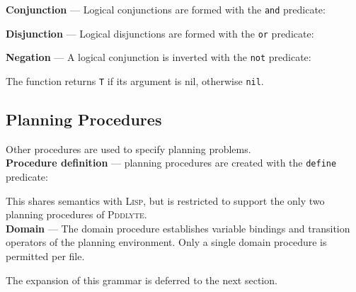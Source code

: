 \documentclass[
a4paper, %
11pt, %
onecolumn, %
openany, %
]{memoir}
\begin{document}
{\textbf{\small Conjunction} --- Logical conjunctions are formed with the \texttt{and} predicate: 
\begin{bnf*}
\end{bnf*}


\textbf{\small Disjunction} --- Logical disjunctions are formed with the \texttt{or} predicate:

\begin{bnf*}
\end{bnf*}

\textbf{\small Negation} --- A logical conjunction is inverted with the \texttt{not} predicate:
\begin{bnf*}
\end{bnf*}
The function returns \texttt{T} if its argument is nil, otherwise \texttt{nil}.\\

\subsection{Planning Procedures}
Other procedures are used to specify planning problems.\\

\textbf{\small Procedure definition} --- planning procedures are created with the \texttt{define} predicate:
\begin{bnf*}
\end{bnf*}
This shares semantics with \textsc{Lisp}, but is restricted to support the only two planning procedures of \textsc{Pddlyte}.\\

\textbf{\small Domain} ---
The domain procedure establishes variable bindings and transition operators of the planning environment. Only a single domain procedure is permitted per file. 
\begin{bnf*}
\end{bnf*}
The expansion of this grammar is deferred to the next section.\\

}
\end{document}
